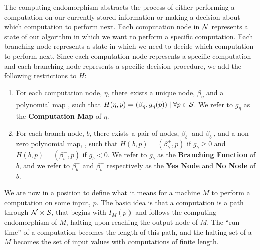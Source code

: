 \documentclass[twoside]{article}
\begin{document}
The computing endomorphism abstracts the process of either
performing a computation on our currently stored information or
making a decision about which computation to perform next.  Each
computation node in $\mathcal{N}$ represents a state of our algorithm in
which we want to perform a specific computation.  Each branching
node represents a state in which we need to decide which computation
to perform next.  Since each computation node represents a specific
computation and each branching node represents a specific decision
procedure, we add the following restrictions to $H$:

\begin{enumerate}
  
\item For each computation node, $\eta$, there exists a unique node,
  $\beta_\eta$ and a polynomial map
  , such that $H(\eta, p)
  = (\beta_\eta, g_\eta(p)) \mid \forall p \in \mathcal{S}$.  We
  refer to $g_\eta$ as the \textbf{Computation Map} of $\eta$.
  
\item For each branch node, $b$, there exists a pair of nodes,
  $\beta_b^+$ and $\beta_b^-$, and a non-zero polynomial map,
  , such that $H(b, p) = (\beta_b^+,
  p)$ if $g_b \geq 0$ and $H(b,p) = (\beta_b^-, p)$ if $g_b < 0$.
  We refer to $g_b$ as the \textbf{Branching Function} of $b$, and
  we refer to $\beta_b^+$ and $\beta_b^-$ respectively as the
  \textbf{Yes Node} and \textbf{No Node} of $b$.
  
\end{enumerate}

We are now in a position to define what it means for a machine $M$
to perform a computation on some input, $p$.  The basic idea is that a 
computation is a path through $\mathcal{N} \times \mathcal{S}$, that begins
with $I_M(p)$ and follows the computing endomorphism of $M$, halting upon
reaching the output node of $M$.  The ``run time'' of a computation becomes
the length of this path, and the halting set of a $M$ becomes the set of input
values with computations of finite length.
\end{document}
